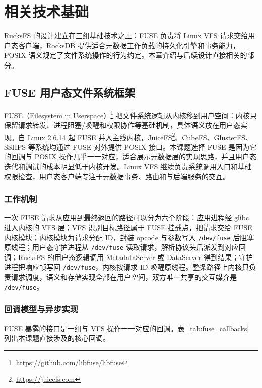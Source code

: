 \section{相关技术基础}
\label{sec:related_works}

RucksFS 的设计建立在三组基础技术之上：FUSE 负责将 Linux VFS 请求交给用户态客户端，RocksDB 提供适合元数据工作负载的持久化引擎和事务能力，POSIX 语义规定了文件系统操作的行为约定。本章介绍与后续设计直接相关的部分。

\subsection{FUSE 用户态文件系统框架}

FUSE（Filesystem in Userspace）\footnote{\url{https://github.com/libfuse/libfuse}} 把文件系统逻辑从内核移到用户空间：内核只保留请求转发、进程阻塞/唤醒和权限协作等基础机制，具体语义放在用户态实现。自 Linux 2.6.14 起 FUSE 并入主线内核，JuiceFS\footnote{\url{https://juicefs.com}}、CubeFS\cite{liu2019cubefs}、GlusterFS、SSHFS 等系统均通过 FUSE 对外提供 POSIX 接口。本课题选择 FUSE 是因为它的回调与 POSIX 操作几乎一一对应，适合展示元数据层的实现思路，并且用户态迭代和调试的成本明显低于内核开发。Linux VFS 继续负责系统调用入口和基础权限检查，用户态客户端专注于元数据事务、路由和与后端服务的交互。

\subsubsection{工作机制}

一次 FUSE 请求从应用到最终返回的路径可以分为六个阶段：应用进程经 glibc 进入内核的 VFS 层；VFS 识别目标路径属于 FUSE 挂载点，把请求交给 FUSE 内核模块；内核模块为请求分配 ID，封装 opcode 与参数写入 \texttt{/dev/fuse} 后阻塞原线程；用户态守护进程从 \texttt{/dev/fuse} 读取请求，解析协议头后派发到对应回调；RucksFS 的用户态逻辑调用 MetadataServer 或 DataServer 得到结果；守护进程把响应帧写回 \texttt{/dev/fuse}，内核按请求 ID 唤醒原线程。整条路径上内核只负责请求调度，语义和存储实现全部在用户空间，双方唯一共享的交互媒介是 \texttt{/dev/fuse}。

\subsubsection{回调模型与异步实现}

FUSE 暴露的接口是一组与 VFS 操作一一对应的回调。表~\ref{tab:fuse_callbacks} 列出本课题直接涉及的核心回调。

